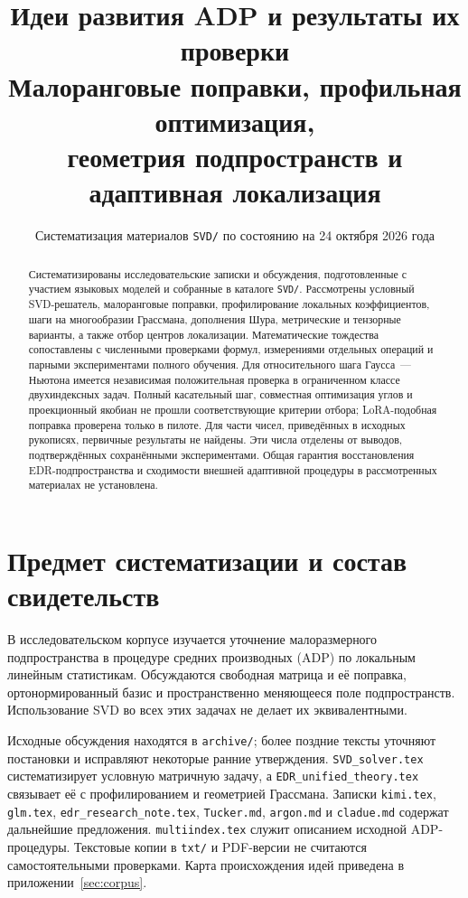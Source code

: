 \documentclass[11pt,a4paper]{article}
\title{Идеи развития ADP и результаты их проверки\\[5pt]
  \large Малоранговые поправки, профильная оптимизация,\\
  геометрия подпространств и адаптивная локализация}
\author{}
\date{Систематизация материалов \texttt{SVD/} по состоянию на 24 октября 2026 года}
\numberwithin{equation}{section}
\newcommand{\file}[1]{\nolinkurl{#1}}
\begin{document}
\maketitle
\begin{abstract}
Систематизированы исследовательские записки и обсуждения, подготовленные
с участием языковых моделей и собранные в каталоге \file{SVD/}.
Рассмотрены условный SVD-решатель, малоранговые поправки, профилирование
локальных коэффициентов, шаги на многообразии Грассмана, дополнения Шура,
метрические и тензорные варианты, а также отбор центров локализации.
Математические тождества сопоставлены с численными проверками формул,
измерениями отдельных операций и парными экспериментами полного обучения.
Для относительного шага Гаусса~--- Ньютона имеется независимая положительная
проверка в ограниченном классе двухиндексных задач. Полный касательный шаг,
совместная оптимизация углов и проекционный якобиан не прошли соответствующие
критерии отбора; LoRA-подобная поправка проверена только в пилоте.
Для части чисел, приведённых в исходных рукописях, первичные результаты
не найдены. Эти числа отделены от выводов, подтверждённых сохранёнными
экспериментами. Общая гарантия восстановления EDR-подпространства
и сходимости внешней адаптивной процедуры в рассмотренных материалах
не установлена.
\end{abstract}
\tableofcontents
\newpage

\section{Предмет систематизации и состав свидетельств}

В исследовательском корпусе изучается уточнение малоразмерного
подпространства в процедуре средних производных (ADP) по локальным
линейным статистикам. Обсуждаются свободная матрица и её поправка,
ортонормированный базис и пространственно меняющееся поле подпространств.
Использование SVD во всех этих задачах не делает их эквивалентными.

Исходные обсуждения находятся в \file{archive/}; более поздние тексты
уточняют постановки и исправляют некоторые ранние утверждения.
\file{SVD_solver.tex} систематизирует условную матричную задачу,
а \file{EDR_unified_theory.tex} связывает её с профилированием
и геометрией Грассмана. Записки \file{kimi.tex}, \file{glm.tex},
\file{edr_research_note.tex}, \file{Tucker.md}, \file{argon.md}
и \file{cladue.md} содержат дальнейшие предложения.
\file{multiindex.tex} служит описанием исходной ADP-процедуры.
Текстовые копии в \file{txt/} и PDF-версии не считаются самостоятельными
проверками. Карта происхождения идей приведена в приложении~\ref{sec:corpus}.
\end{document}
